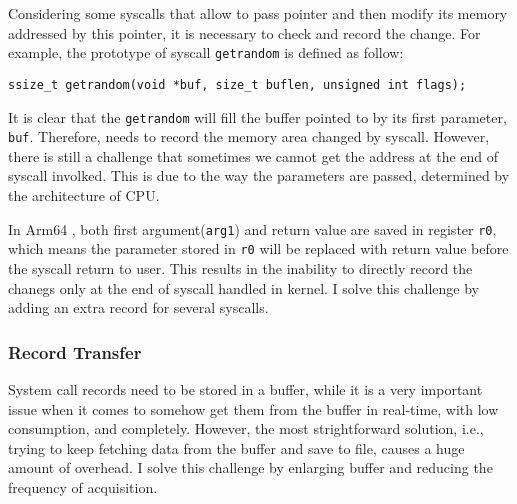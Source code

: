 Considering some syscalls that allow to pass pointer and then modify its memory addressed by this pointer, it is necessary to check and record the change. For example, the prototype of syscall \texttt{getrandom} is defined as follow:\cite{getrandom2}


\centerline{\texttt{ssize\_t getrandom(void *buf, size\_t buflen, unsigned int flags);}}

It is clear that the \texttt{getrandom} will fill the buffer pointed to by its first parameter, \texttt{buf}. Therefore, \TheName needs to record the memory area changed by syscall. However, there is still a challenge that sometimes we cannot get the address at the end of syscall involked. This is due to the way the parameters are passed, determined by the architecture of CPU.

In Arm64 \cite{syscall}, both first argument(\texttt{arg1}) and return value are saved in register \texttt{r0}, which means the parameter stored in \texttt{r0} will be replaced with return value before the syscall return to user. This results in the inability to directly record the chanegs only at the end of syscall handled in kernel. I solve this challenge by adding an extra record for several syscalls.




\subsubsection{Record Transfer}

System call records need to be stored in a buffer, while it is a very important issue when it comes to somehow get them from the buffer in real-time, with low consumption, and completely. However, the most strightforward solution, i.e., trying to keep fetching data from the buffer and save to file, causes a huge amount of overhead. I solve this challenge by enlarging buffer and reducing the frequency of acquisition.




